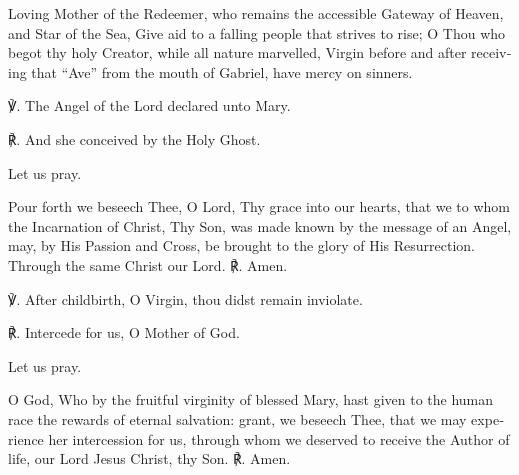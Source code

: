\begin{otherlanguage}{english}Loving Mother of the Redeemer, 
who remains the accessible Gateway of Heaven,
and Star of the Sea,
Give aid to a falling people 
that strives to rise;
O Thou who begot thy holy Creator,
while all nature marvelled,
Virgin before and after
receiving that ``Ave'' from the mouth of Gabriel,
have mercy on sinners.


℣. The Angel of the Lord declared unto Mary.

℟. And she conceived by the Holy Ghost.

Let us pray.

Pour forth we beseech Thee, O Lord, Thy grace into our hearts, that we to whom the Incarnation of Christ, Thy Son, was made known by the message of an Angel, may, by His Passion and Cross, be brought to the glory of His Resurrection. Through the same Christ our Lord. ℟. Amen.


℣. After childbirth, O Virgin, thou didst remain inviolate.

℟. Intercede for us, O Mother of God.

Let us pray.

O God, Who by the fruitful virginity of blessed Mary, hast given to the human race the rewards of eternal salvation: grant, we beseech Thee, that we may experience her intercession for us, through whom we deserved to receive the Author of life, our Lord Jesus Christ, thy Son. ℟. Amen.
\end{otherlanguage}